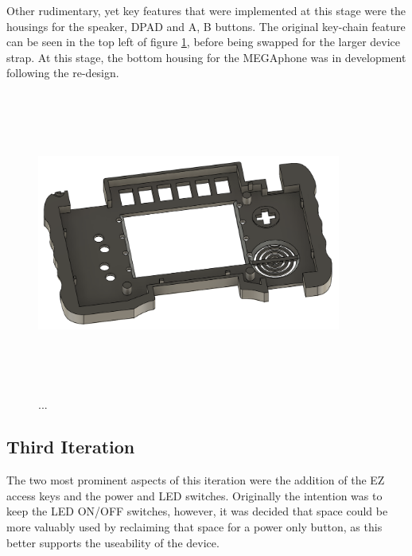 Other rudimentary, yet key features that were implemented at this stage were the housings for the speaker, DPAD and A, B buttons.
The original key-chain feature can be seen in the top left of figure \ref{fig:iteration2_t_b}, before being swapped for the larger device strap.
At this stage, the bottom housing for the MEGAphone was in development following the re-design.

\begin{figure} [h]
    \centering
    \includegraphics[width=10cm,height=10cm,keepaspectratio]{Figures/iteration2_top_back.png}
    \caption{...}
    \label{fig:iteration2_t_b}
\end{figure}

\subsection{Third Iteration}

The two most prominent aspects of this iteration were the addition of the EZ access keys and the power and LED switches.
Originally the intention was to keep the LED ON/OFF switches, however, it was decided that space could be more valuably used by reclaiming that space for a power only button, as this better supports the useability of the device.

